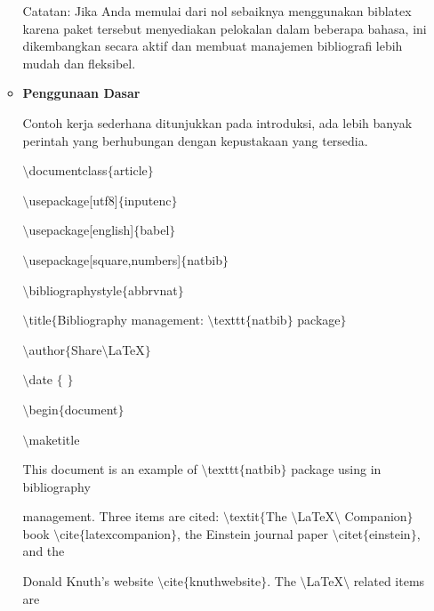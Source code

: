\begin{itemize}
\begin{itemize}
Catatan: Jika Anda memulai dari nol sebaiknya menggunakan biblatex karena paket tersebut menyediakan pelokalan dalam beberapa bahasa, ini dikembangkan secara aktif dan membuat manajemen bibliografi lebih mudah dan fleksibel.\par

	\item {\fontsize{14pt}{14pt}\selectfont \textbf{Penggunaan Dasar}}\par

Contoh kerja sederhana ditunjukkan pada introduksi, ada lebih banyak perintah yang berhubungan dengan kepustakaan yang tersedia.\par

\hspace*{0.5in}$\setminus$documentclass$ \{ $article$ \} $\par

$\setminus$usepackage[utf8]$ \{ $inputenc$ \} $\par

$\setminus$usepackage[english]$ \{ $babel$ \} $\par

$\setminus$usepackage[square,numbers]$ \{ $natbib$ \} $\par

$\setminus$bibliographystyle$ \{ $abbrvnat$ \} $\par

$\setminus$title$ \{ $Bibliography management: $\setminus$texttt$ \{ $natbib$ \} $ package$ \} $\par

$\setminus$author$ \{ $Share$\setminus$LaTeX$ \} $\par

$\setminus$date $ \{ $ $ \} $\par

$\setminus$begin$ \{ $document$ \} $\par

$\setminus$maketitle\par

This document is an example of $\setminus$texttt$ \{ $natbib$ \} $ package using in bibliography \par

management. Three items are cited: $\setminus$textit$ \{ $The $\setminus$LaTeX$\setminus$ Companion$ \} $ book $\setminus$cite$ \{ $latexcompanion$ \} $, the Einstein journal paper $\setminus$citet$ \{ $einstein$ \} $, and the \par

Donald Knuth's website $\setminus$cite$ \{ $knuthwebsite$ \} $. The $\setminus$LaTeX$\setminus$ related items are\par


\end{itemize}
\end{itemize}
